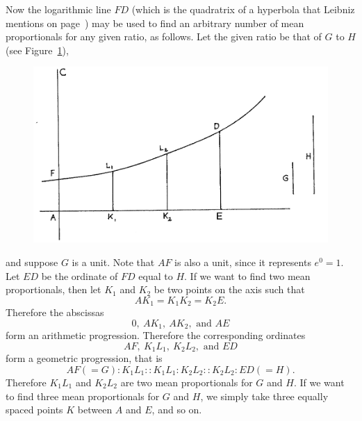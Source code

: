 \documentclass[twoside,openright]{article}
\begin{document}
Now the logarithmic line $FD$ (which is the quadratrix of a hyperbola that Leibniz mentions on page~\pageref{logtrans}) may be used to find an arbitrary number of mean proportionals for any given ratio, as follows.  Let the given ratio be that of $G$ to $H$ (see Figure~\ref{meanprops}),
\begin{figure}[htp]
\begin{center}
\includegraphics[width=\textwidth]{fig/Figure53}
\caption{}
\label{meanprops}
\vspace{-10pt}
\end{center}
\end{figure} 
 and suppose $G$ is a unit.  Note that $AF$ is also a unit, since it represents $e^0 = 1$.  Let $ED$ be the ordinate of $FD$ equal to $H$.  If we want to find two mean proportionals, then let $K_1$ and $K_2$ be two points on the axis such that
$$AK_1 = K_1K_2 = K_2E.$$
Therefore the abscissas
$$0,\ AK_1,\ AK_2,\mbox{ and }AE$$
form an arithmetic progression.  Therefore the corresponding ordinates
$$AF,\ K_1L_1,\ K_2L_2,\mbox{ and }ED$$
form a geometric progression, that is
$$AF(=G) \!:\! K_1L_1 :: K_1L_1 \!:\! K_2L_2 :: K_2L_2 \!:\! ED (=H).$$
Therefore $K_1L_1$ and $K_2L_2$ are two mean proportionals for $G$ and $H$.  If we want to find three mean proportionals for $G$ and $H$, we simply take three equally spaced points $K$ between $A$ and $E$, and so on.   
\end{document}

